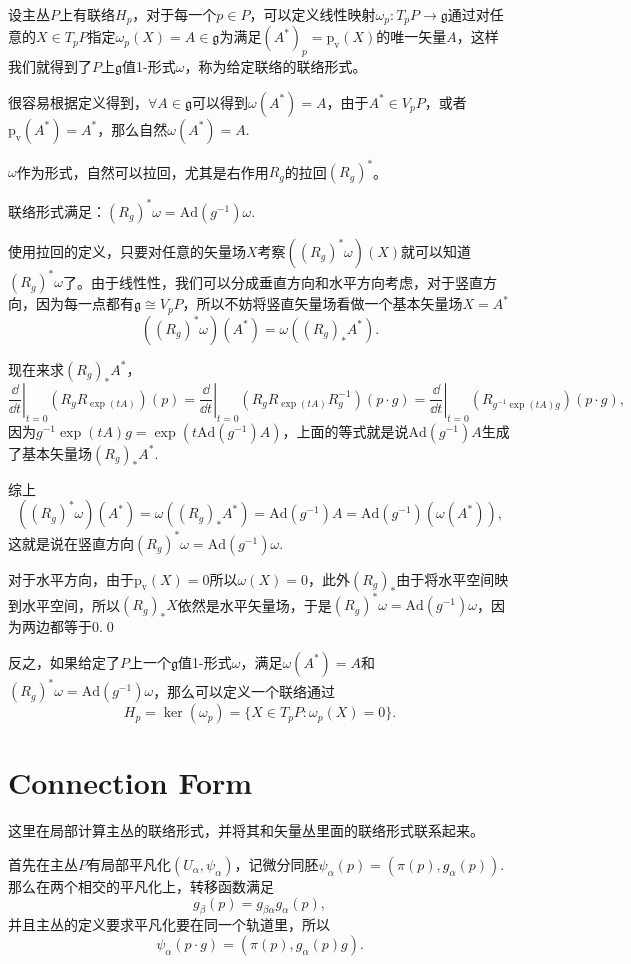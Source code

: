设主丛$P$上有联络$H_p$，对于每一个$p\in P$，可以定义线性映射$\omega_p:T_p P\to \mathfrak{g}$通过对任意的$X\in T_p P$指定$\omega_p(X)=A\in \mathfrak{g}$为满足$(A^*)_p=\mathrm{p_v}(X)$的唯一矢量$A$，这样我们就得到了$P$上$\mathfrak{g}$值1-形式$\omega$，称为给定联络的联络形式。

很容易根据定义得到，$\forall A\in\mathfrak{g}$可以得到$\omega(A^*)=A$，由于$A^*\in V_pP$，或者$\mathrm{p_v}(A^*)=A^*$，那么自然$\omega(A^*)=A$.

$\omega$作为形式，自然可以拉回，尤其是右作用$R_g$的拉回$(R_g)^*$。

\pro 	联络形式满足：$(R_g)^*\omega=\mathrm{Ad}(g^{-1})\omega$.

\proof 使用拉回的定义，只要对任意的矢量场$X$考察$((R_g)^*\omega)(X)$就可以知道$(R_g)^*\omega$了。由于线性性，我们可以分成垂直方向和水平方向考虑，对于竖直方向，因为每一点都有$\mathfrak{g}\cong V_pP$，所以不妨将竖直矢量场看做一个基本矢量场$X=A^*$
\[
	((R_g)^*\omega)(A^*)=\omega((R_g)_*A^*).
\]

现在来求$(R_g)_*A^*$，
\[
	\left.\frac{\dd}{\dd t}\right|_{t=0}(R_gR_{\exp(tA)})(p)=\left.\frac{\dd}{\dd t}\right|_{t=0}(R_gR_{\exp(tA)}R_g^{-1})(p\cdot g)=\left.\frac{\dd}{\dd t}\right|_{t=0}(R_{g^{-1}\exp(tA)g})(p\cdot g),
\]
因为$g^{-1}\exp(tA)g=\exp(t\mathrm{Ad}(g^{-1})A)$，上面的等式就是说$\mathrm{Ad}(g^{-1})A$生成了基本矢量场$\left(R_g\right)_*A^*$.

综上
\[
	((R_g)^*\omega)(A^*)=\omega((R_g)_*A^*)=\mathrm{Ad}(g^{-1})A=\mathrm{Ad}(g^{-1})(\omega(A^*)),
\]
这就是说在竖直方向$(R_g)^*\omega=\mathrm{Ad}(g^{-1})\omega$.

对于水平方向，由于$\mathrm{p_v}(X)=0$所以$\omega(X)=0$，此外$(R_g)_*$由于将水平空间映到水平空间，所以$(R_g)_*X$依然是水平矢量场，于是$(R_g)^*\omega=\mathrm{Ad}(g^{-1})\omega$，因为两边都等于0.\qed

反之，如果给定了$P$上一个$\mathfrak{g}$值1-形式$\omega$，满足$\omega(A^*)=A$和$(R_g)^*\omega=\mathrm{Ad}(g^{-1})\omega$，那么可以定义一个联络通过
\[
	H_p=\ker(\omega_p)=\{X\in T_p P:\omega_p(X)=0\}.
\]
\section{Connection Form}
这里在局部计算主丛的联络形式，并将其和矢量丛里面的联络形式联系起来。

首先在主丛$P$有局部平凡化$(U_\alpha,\psi_\alpha)$，记微分同胚$\psi_\alpha(p)=(\pi(p),g_\alpha(p))$.那么在两个相交的平凡化上，转移函数满足
\[
	g_\beta(p)=g_{\beta\alpha}g_\alpha(p),
\]
并且主丛的定义要求平凡化要在同一个轨道里，所以
\[
	\psi_\alpha(p\cdot g)=(\pi(p),g_\alpha(p)g).
\]

